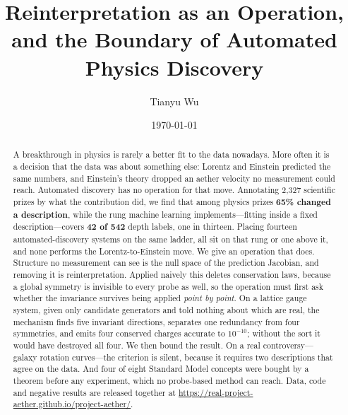 \documentclass[aps,pra,twocolumn,superscriptaddress,nofootinbib,10pt]{revtex4-2}
\begin{document}
\title{Reinterpretation as an Operation,\\
and the Boundary of Automated Physics Discovery}

\author{Tianyu Wu}

\date{\today}

\begin{abstract}
A breakthrough in physics is rarely a better fit to the data nowadays. More often it is a
decision that
the data was about something else: Lorentz and Einstein predicted the same numbers, and
Einstein's theory dropped an aether velocity no measurement could reach. Automated discovery has
no operation for that move. Annotating 2{,}327 scientific prizes by what the contribution did, we
find that among physics prizes \textbf{65\% changed a description}, while the rung machine
learning implements---fitting inside a fixed description---covers \textbf{42 of 542} depth
labels, one in thirteen. Placing fourteen automated-discovery systems on the same ladder, all sit
on that rung or one above it, and none performs the Lorentz-to-Einstein move. We give an
operation that does. Structure no measurement can see is the null space of the prediction
Jacobian, and removing it is reinterpretation. Applied naively this deletes conservation laws,
because a global symmetry is invisible to every probe as well, so the operation must first ask
whether the invariance survives being applied \emph{point by point}. On a lattice gauge system,
given only candidate generators and told nothing about which are real, the mechanism finds five
invariant directions, separates one redundancy from four symmetries, and emits four conserved
charges accurate to $10^{-10}$; without the sort it would have destroyed all four. We then bound
the result. On a real controversy---galaxy rotation curves---the criterion is silent, because it
requires two descriptions that agree on the data. And four of eight Standard Model concepts were
bought by a theorem before any experiment, which no probe-based method can reach. Data, code and
negative results are released together at
\url{https://real-project-aether.github.io/project-aether/}.
\end{abstract}

\maketitle
\end{document}
